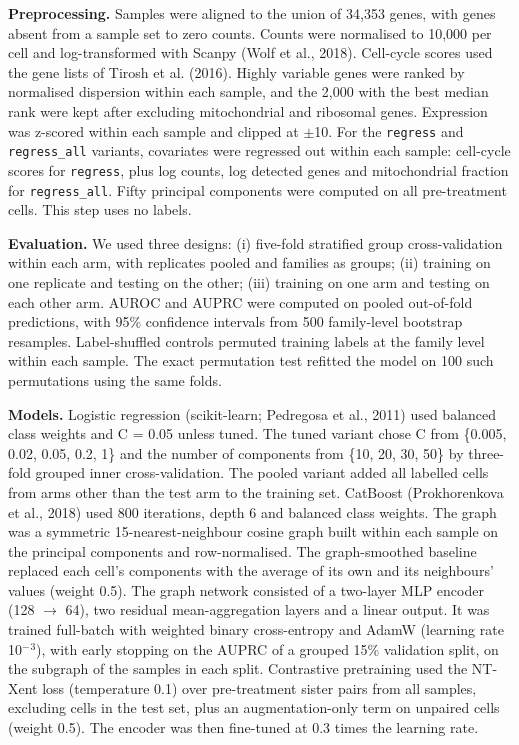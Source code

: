 \documentclass[11pt,a4paper]{article}
\begin{document}
\textbf{Preprocessing.} Samples were aligned to the union of 34,353 genes, with genes absent from a sample set to zero counts. Counts were normalised to 10,000 per cell and log-transformed with Scanpy (Wolf et al., 2018). Cell-cycle scores used the gene lists of Tirosh et al. (2016). Highly variable genes were ranked by normalised dispersion within each sample, and the 2,000 with the best median rank were kept after excluding mitochondrial and ribosomal genes. Expression was z-scored within each sample and clipped at $\pm$10. For the \texttt{regress} and \texttt{regress\_all} variants, covariates were regressed out within each sample: cell-cycle scores for \texttt{regress}, plus log counts, log detected genes and mitochondrial fraction for \texttt{regress\_all}. Fifty principal components were computed on all pre-treatment cells. This step uses no labels.

\textbf{Evaluation.} We used three designs: (i) five-fold stratified group cross-validation within each arm, with replicates pooled and families as groups; (ii) training on one replicate and testing on the other; (iii) training on one arm and testing on each other arm. AUROC and AUPRC were computed on pooled out-of-fold predictions, with 95\% confidence intervals from 500 family-level bootstrap resamples. Label-shuffled controls permuted training labels at the family level within each sample. The exact permutation test refitted the model on 100 such permutations using the same folds.

\textbf{Models.} Logistic regression (scikit-learn; Pedregosa et al., 2011) used balanced class weights and C = 0.05 unless tuned. The tuned variant chose C from \{0.005, 0.02, 0.05, 0.2, 1\} and the number of components from \{10, 20, 30, 50\} by three-fold grouped inner cross-validation. The pooled variant added all labelled cells from arms other than the test arm to the training set. CatBoost (Prokhorenkova et al., 2018) used 800 iterations, depth 6 and balanced class weights. The graph was a symmetric 15-nearest-neighbour cosine graph built within each sample on the principal components and row-normalised. The graph-smoothed baseline replaced each cell's components with the average of its own and its neighbours' values (weight 0.5). The graph network consisted of a two-layer MLP encoder (128 $\rightarrow$ 64), two residual mean-aggregation layers and a linear output. It was trained full-batch with weighted binary cross-entropy and AdamW (learning rate 10$^-$$^3$), with early stopping on the AUPRC of a grouped 15\% validation split, on the subgraph of the samples in each split. Contrastive pretraining used the NT-Xent loss (temperature 0.1) over pre-treatment sister pairs from all samples, excluding cells in the test set, plus an augmentation-only term on unpaired cells (weight 0.5). The encoder was then fine-tuned at 0.3 times the learning rate.
\end{document}
